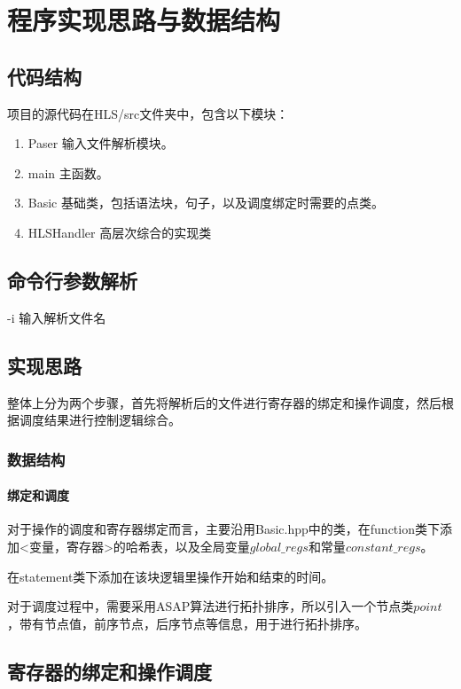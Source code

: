 \documentclass[12pt,hyperref,a4paper,UTF8]{ctexart}
\begin{document}
\section{程序实现思路与数据结构}

\subsection{代码结构}

项目的源代码在HLS/src文件夹中，包含以下模块：

\begin{enumerate}
    \item Paser 输入文件解析模块。
    \item main 主函数。
    \item Basic 基础类，包括语法块，句子，以及调度绑定时需要的点类。
    \item HLSHandler 高层次综合的实现类
\end{enumerate}

\subsection{命令行参数解析}

-i 输入解析文件名

\subsection{实现思路}

整体上分为两个步骤，首先将解析后的文件进行寄存器的绑定和操作调度，然后根据调度结果进行控制逻辑综合。

\subsubsection{数据结构}

\paragraph{绑定和调度}

对于操作的调度和寄存器绑定而言，主要沿用Basic.hpp中的类，在function类下添加<变量，寄存器>的哈希表，以及全局变量$global\_regs$和常量$constant\_regs$。

在statement类下添加在该块逻辑里操作开始和结束的时间。

对于调度过程中，需要采用ASAP算法进行拓扑排序，所以引入一个节点类$point$，带有节点值，前序节点，后序节点等信息，用于进行拓扑排序。

\subsection{寄存器的绑定和操作调度}
\end{document}
